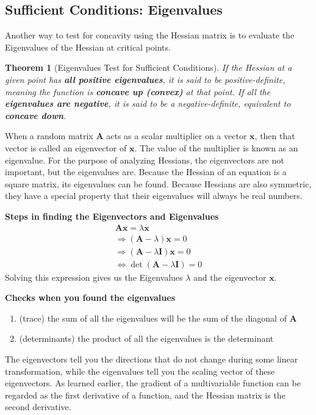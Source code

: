 \documentclass[10pt,a4paper]{book}
\newtheorem{theorem}{Theorem}[section]
\theoremstyle{definition}\newtheorem{definition}{Definition}
\theoremstyle{definition}\newtheorem{fact}{Fact}
\theoremstyle{definition}\newtheorem{ex}{Ex.}
\theoremstyle{definition}\newtheorem{project}{Project}
\theoremstyle{definition}\newtheorem{problem}{Problem}
\theoremstyle{definition}\newtheorem{example}{Example}
\numberwithin{theorem}{chapter}
\numberwithin{corollary}{chapter}
\numberwithin{assumption}{chapter}
\numberwithin{definition}{chapter}
\numberwithin{prop}{chapter}
\numberwithin{notation}{chapter}
\numberwithin{problem}{chapter}
\numberwithin{example}{chapter}
\numberwithin{fact}{chapter}
\numberwithin{ex}{chapter}
\newenvironment{ftheorem}
{\begin{mdframed}\begin{theorem}}
		{\end{theorem}\end{mdframed}}
\def\A{\mathbf A}
\def\I{\mathbf I}
\def\x{\mathbf x}
\begin{document}
	\subsection{Sufficient Conditions: Eigenvalues}
	Another way to test for concavity using the Hessian matrix is to evaluate the Eigenvalues of the Hessian at critical points. 
	
	\begin{ftheorem}[Eigenvalues Test for Sufficient Conditions]
		If the Hessian at a given point has \textbf{all positive eigenvalues}, it is said to be positive-definite, meaning the function is \textbf{concave up (convex)} at that point. If all the \textbf{eigenvalues are negative}, it is said to be a negative-definite, equivalent to \textbf{concave down}.
	\end{ftheorem}
		
	When a random matrix $\A$ acts as a scalar multiplier on a vector $\x$, then that vector is called an eigenvector of $\x$. The value of the multiplier is known as an eigenvalue. For the purpose of analyzing Hessians, the eigenvectors are not important, but the eigenvalues are. Because the Hessian of an equation is a square matrix, its eigenvalues can be found. Because Hessians are also symmetric, they have a special property that their eigenvalues will always be real numbers. 
	
	\textbf{Steps in finding the Eigenvectors and Eigenvalues}
	\begin{align*}
		\A \x = \lambda \x                   \\
		\Rightarrow (\A - \lambda) \x = 0    \\
		\Rightarrow (\A - \lambda \I) \x = 0 \\
		\iff \det (\A - \lambda \I) = 0      
	\end{align*}
	Solving this expression gives us the Eigenvalues $\lambda$ and the eigenvector $\x$.
	
	\textbf{Checks when you found the eigenvalues}
	\begin{enumerate}
		\item (trace) the sum of all the eigenvalues will be the sum of the diagonal of $\A$
		\item (determinants) the product of all the eigenvalues is the determinant
	\end{enumerate}
	
	The eigenvectors tell you the directions that do not change during some linear transformation, while the eigenvalues tell you the scaling vector of these eigenvectors. As learned earlier, the gradient of a multivariable function can be regarded as the first derivative of a function, and the Hessian matrix is the second derivative. 
	
\end{document}
